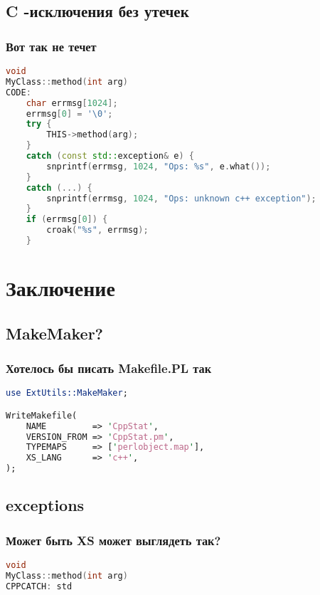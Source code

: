 \documentclass[pdflatex,hyperref={unicode=true}]{beamer}
\DeclareRobustCommand{\cpp}{
    \texorpdfstring{\hbox{C\hspace{-0.5ex}\protect\raisebox{0.5ex}{\protect\scalebox{0.67}{++}}}}{C++}
}
\begin{document}
\subsection{\cpp-исключения без утечек}
\begin{frame}[fragile]
    \frametitle{Вот так не течет}
    \begin{lstlisting}[language=C++,style=PerlXS]
void
MyClass::method(int arg)
CODE:
    char errmsg[1024];
    errmsg[0] = '\0';
    try {
        THIS->method(arg);
    }
    catch (const std::exception& e) {
        snprintf(errmsg, 1024, "Ops: %s", e.what());
    }
    catch (...) {
        snprintf(errmsg, 1024, "Ops: unknown c++ exception");
    }
    if (errmsg[0]) {
        croak("%s", errmsg);
    }
    \end{lstlisting}
\end{frame}

\section{Заключение}

\subsection{MakeMaker?}

\begin{frame}[fragile]
    \frametitle{Хотелось бы писать Makefile.PL так}
    \begin{lstlisting}[language=Perl]
use ExtUtils::MakeMaker;

WriteMakefile(
    NAME         => 'CppStat',
    VERSION_FROM => 'CppStat.pm',
    TYPEMAPS     => ['perlobject.map'],
    XS_LANG      => 'c++',
);
    \end{lstlisting}
\end{frame}

\subsection{exceptions}
\begin{frame}[fragile]
    \frametitle{Может быть XS может выглядеть так?}
    \begin{lstlisting}[language=C++,style=PerlXS]
void
MyClass::method(int arg)
CPPCATCH: std
    \end{lstlisting}
\end{frame}
\end{document}
